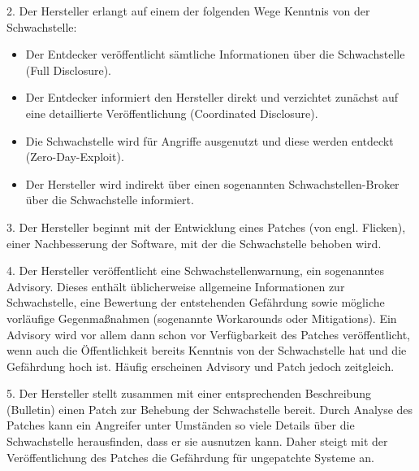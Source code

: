 \documentclass[12pt,oneside,a4paper,parskip]{scrbook}
\begin{document}
  2. Der Hersteller erlangt auf einem der folgenden Wege Kenntnis von der Schwachstelle:
  \begin{itemize}
    \item Der Entdecker veröffentlicht sämtliche Informationen über die Schwachstelle (\glqq Full Disclosure\grqq).
    \item Der Entdecker informiert den Hersteller direkt und verzichtet zunächst auf eine detaillierte
    Veröffentlichung (\glqq Coordinated Disclosure\grqq).
    \item Die Schwachstelle wird für Angriffe ausgenutzt und diese werden entdeckt (\glqq Zero-Day-Exploit\grqq).
    \item Der Hersteller wird indirekt über einen sogenannten Schwachstellen-Broker über die Schwachstelle informiert.
  \end{itemize}
  3. Der Hersteller beginnt mit der Entwicklung eines Patches (von engl. Flicken), einer Nachbesserung der Software, mit der die Schwachstelle behoben wird.

  4. Der Hersteller veröffentlicht eine Schwachstellenwarnung, ein sogenanntes Advisory. Dieses
  enthält üblicherweise allgemeine Informationen zur Schwachstelle, eine Bewertung der
  entstehenden Gefährdung sowie mögliche vorläufige Gegenmaßnahmen (sogenannte
  Workarounds oder Mitigations). Ein Advisory wird vor allem dann schon vor Verfügbarkeit
  des Patches veröffentlicht, wenn auch die Öffentlichkeit bereits Kenntnis von der Schwachstelle hat und die Gefährdung hoch ist. Häufig erscheinen Advisory und Patch jedoch zeitgleich.

  5. Der Hersteller stellt zusammen mit einer entsprechenden Beschreibung (Bulletin) einen
  Patch zur Behebung der Schwachstelle bereit. Durch Analyse des Patches kann ein Angreifer
  unter Umständen so viele Details über die Schwachstelle herausfinden, dass er sie ausnutzen
  kann. Daher steigt mit der Veröffentlichung des Patches die Gefährdung für ungepatchte
  Systeme an.
\end{document}
